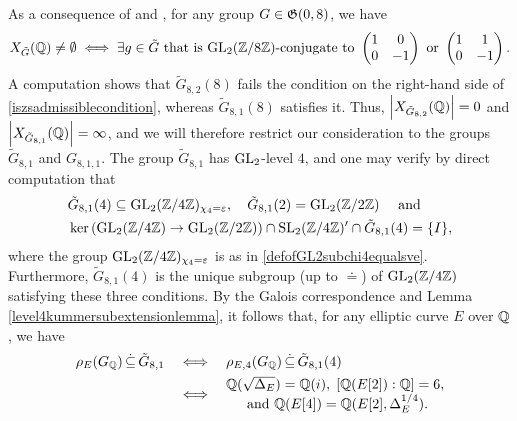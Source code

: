 As a consequence of \cite[Lemma 28]{sutherlandzywina} and \cite[Proposition 3.1]{sutherlandzywina}, for any group $G \in \mathfrak{G}(0,8)$, we have
\begin{equation} \label{iszsadmissiblecondition}
X_{\tilde{G}}(\mathbb{Q}) \neq \emptyset \; \Longleftrightarrow \; \exists g \in \tilde{G} \text{ that is $\operatorname{GL}_2(\mathbb{Z}/8\mathbb{Z})$-conjugate to } \begin{pmatrix} 1 & 0 \\ 0 & -1 \end{pmatrix} \text{ or } \begin{pmatrix} 1 & 1 \\ 0 & -1 \end{pmatrix}.
\end{equation}
A computation shows that $\tilde{G}_{8,2}(8)$ fails the condition on the right-hand side of \eqref{iszsadmissiblecondition}, whereas $\tilde{G}_{8,1}(8)$ satisfies it. Thus, $\left| X_{\tilde{G}_{8,2}}(\mathbb{Q}) \right| = 0$ and $\left| X_{\tilde{G}_{8,1}}(\mathbb{Q}) \right| = \infty$, and we will therefore restrict our consideration to the groups $\tilde{G}_{8,1}$ and $G_{8,1,1}$. The group $\tilde{G}_{8,1}$ has $\operatorname{GL}_2$-level $4$, and one may verify by direct computation that
\[
\begin{split}
&\tilde{G}_{8,1}(4) \subseteq \operatorname{GL}_2(\mathbb{Z}/4\mathbb{Z})_{\chi_4 = \varepsilon}, \quad \tilde{G}_{8,1}(2) = \operatorname{GL}_2(\mathbb{Z}/2\mathbb{Z}) \quad \text{ and } \\
&\ker\left( \operatorname{GL}_2(\mathbb{Z}/4\mathbb{Z}) \rightarrow \operatorname{GL}_2(\mathbb{Z}/2\mathbb{Z}) \right) \cap \operatorname{SL}_2(\mathbb{Z}/4\mathbb{Z})' \cap \tilde{G}_{8,1}(4) = \{ I \},
\end{split}
\]
where the group $\operatorname{GL}_2(\mathbb{Z}/4\mathbb{Z})_{\chi_4 = \varepsilon}$ is as in \eqref{defofGL2subchi4equalsve}. Furthermore, $\tilde{G}_{8,1}(4)$ is the unique subgroup (up to $\doteq$) of $\operatorname{GL}_2(\mathbb{Z}/4\mathbb{Z})$ satisfying these three conditions.
By the Galois correspondence and Lemma \ref{level4kummersubextensionlemma}, it follows that, for any elliptic curve $E$ over $\mathbb{Q}$, we have
\begin{equation} \label{rhocontainedintildeGsub81}
\begin{split}
\rho_{E}(G_{\mathbb{Q}}) \, \dot\subseteq \, \tilde{G}_{8,1} \quad &\Longleftrightarrow \quad \rho_{E,4}(G_{\mathbb{Q}}) \, \dot\subseteq \, \tilde{G}_{8,1}(4) \\
&\Longleftrightarrow \quad \begin{matrix} \mathbb{Q}(\sqrt{\Delta_E}) = \mathbb{Q}(i), \; [\mathbb{Q}(E[2]) : \mathbb{Q} ] =6, \\ \text{ and } \mathbb{Q}(E[4]) = \mathbb{Q}(E[2], \Delta_E^{1/4}). \end{matrix}
\end{split}
\end{equation}
